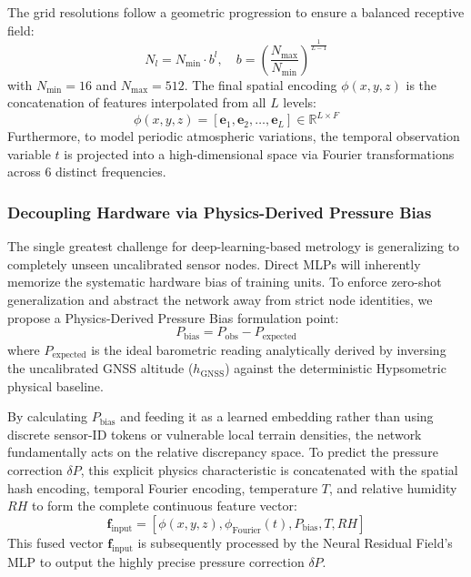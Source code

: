 The grid resolutions follow a geometric progression to ensure a balanced receptive field:
\begin{equation}
N_l = N_{\text{min}} \cdot b^l, \quad b = \left(\frac{N_{\text{max}}}{N_{\text{min}}}\right)^{\frac{1}{L-1}}
\label{eq:resolution}
\end{equation}
with $N_{\text{min}} = 16$ and $N_{\text{max}} = 512$. The final spatial encoding $\phi(x, y, z)$ is the concatenation of features interpolated from all $L$ levels:
\begin{equation}
\phi(x, y, z) = [\mathbf{e}_1, \mathbf{e}_2, \dots, \mathbf{e}_L] \in \mathbb{R}^{L \times F}
\label{eq:concat_encoding}
\end{equation}
Furthermore, to model periodic atmospheric variations, the temporal observation variable $t$ is projected into a high-dimensional space via Fourier transformations across 6 distinct frequencies.

\subsubsection{Decoupling Hardware via Physics-Derived Pressure Bias}
The single greatest challenge for deep-learning-based metrology is generalizing to completely unseen uncalibrated sensor nodes. Direct MLPs will inherently memorize the systematic hardware bias of training units. To enforce zero-shot generalization and abstract the network away from strict node identities, we propose a Physics-Derived Pressure Bias formulation point:
\begin{equation}
P_\text{bias} = P_\text{obs} - P_\text{expected}
\label{eq:bias_formulation}
\end{equation}
where $P_\text{expected}$ is the ideal barometric reading analytically derived by inversing the uncalibrated GNSS altitude ($h_\text{GNSS}$) against the deterministic Hypsometric physical baseline.

By calculating $P_\text{bias}$ and feeding it as a learned embedding rather than using discrete sensor-ID tokens or vulnerable local terrain densities, the network fundamentally acts on the relative discrepancy space. To predict the pressure correction $\delta P$, this explicit physics characteristic is concatenated with the spatial hash encoding, temporal Fourier encoding, temperature $T$, and relative humidity $RH$ to form the complete continuous feature vector:
\begin{equation}
\mathbf{f}_{\text{input}} = [\phi(x, y, z), \phi_{\text{Fourier}}(t), P_\text{bias}, T, RH]
\label{eq:full_input}
\end{equation}
This fused vector $\mathbf{f}_{\text{input}}$ is subsequently processed by the Neural Residual Field's MLP to output the highly precise pressure correction $\delta P$.

